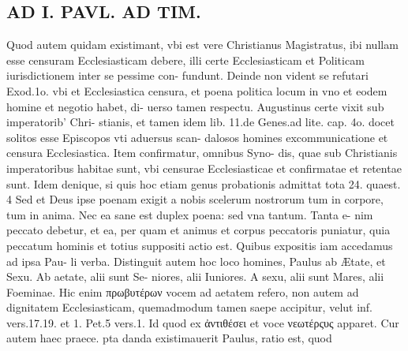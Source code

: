 \documentclass{article}
\begin{document}
\begin{pages}
\section*{AD I. PAVL. AD TIM. }
\marginpar{[ p.248 ]}\pstart Quod autem quidam existimant, vbi est vere Christianus Magistratus, ibi nullam esse censuram Ecclesiasticam debere, illi certe Ecclesiasticam et Politicam iurisdictionem inter se pessime con- fundunt. Deinde non vident se refutari Exod.1o. vbi et Ecclesiastica censura, et poena politica locum in vno et eodem homine et negotio habet, di- uerso tamen respectu. Augustinus certe vixit sub imperatorib' Chri- stianis, et tamen idem lib. 11.de Genes.ad lite. cap. 4o. docet solitos esse Episcopos vti aduersus scan- dalosos homines excommunicatione et censura Ecclesiastica. Item confirmatur, omnibus Syno- dis, quae sub Christianis imperatoribus habitae sunt, vbi censurae Ecclesiasticae et confirmatae et retentae sunt. Idem denique, si quis hoc etiam genus probationis admittat tota 24. quaest. 4 Sed et Deus ipse poenam exigit a nobis scelerum nostrorum tum in corpore, tum in anima. Nec ea sane est duplex poena: sed vna tantum. Tanta e- nim peccato debetur, et ea, per quam et animus et corpus peccatoris puniatur, quia peccatum hominis et totius suppositi actio est. Quibus expositis iam accedamus ad ipsa Pau- li verba. Distinguit autem hoc loco homines, Paulus ab Ætate, et Sexu. Ab aetate, alii sunt Se- niores, alii Iuniores. A sexu, alii sunt Mares, alii Foeminae. Hic enim πρωβυτέρων vocem ad aetatem refero, non autem ad dignitatem Ecclesiasticam, quemadmodum tamen saepe accipitur, velut inf. vers.17.19. et 1. Pet.5 vers.1. Id quod ex ἀντιθέσει et voce νεωτέρςυς apparet. Cur autem haec praece. pta danda existimauerit Paulus, ratio est, quod  \pend

\end{pages}
\end{document}
